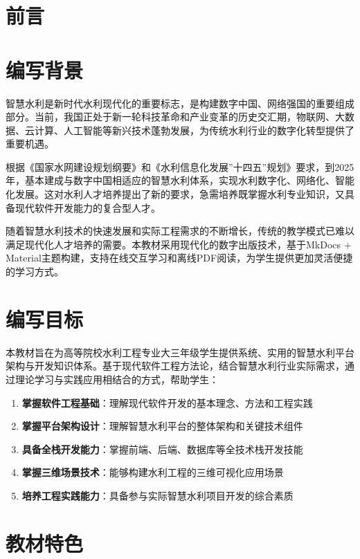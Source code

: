 \section{前言}\label{ux524dux8a00}

\section{编写背景}

智慧水利是新时代水利现代化的重要标志，是构建数字中国、网络强国的重要组成部分。当前，我国正处于新一轮科技革命和产业变革的历史交汇期，物联网、大数据、云计算、人工智能等新兴技术蓬勃发展，为传统水利行业的数字化转型提供了重要机遇。

根据《国家水网建设规划纲要》和《水利信息化发展''十四五''规划》要求，到2025年，基本建成与数字中国相适应的智慧水利体系，实现水利数字化、网络化、智能化发展。这对水利人才培养提出了新的要求，急需培养既掌握水利专业知识，又具备现代软件开发能力的复合型人才。

随着智慧水利技术的快速发展和实际工程需求的不断增长，传统的教学模式已难以满足现代化人才培养的需要。本教材采用现代化的数字出版技术，基于MkDocs + Material主题构建，支持在线交互学习和离线PDF阅读，为学生提供更加灵活便捷的学习方式。

\section{编写目标}

本教材旨在为高等院校水利工程专业大三年级学生提供系统、实用的智慧水利平台架构与开发知识体系。基于现代软件工程方法论，结合智慧水利行业实际需求，通过理论学习与实践应用相结合的方式，帮助学生：

\begin{enumerate}
\def\labelenumi{\arabic{enumi}.}
\tightlist
\item
  \textbf{掌握软件工程基础}：理解现代软件开发的基本理念、方法和工程实践
\item
  \textbf{掌握平台架构设计}：理解智慧水利平台的整体架构和关键技术组件
\item
  \textbf{具备全栈开发能力}：掌握前端、后端、数据库等全技术栈开发技能
\item
  \textbf{掌握三维场景技术}：能够构建水利工程的三维可视化应用场景
\item
  \textbf{培养工程实践能力}：具备参与实际智慧水利项目开发的综合素质
\end{enumerate}

\section{教材特色}

